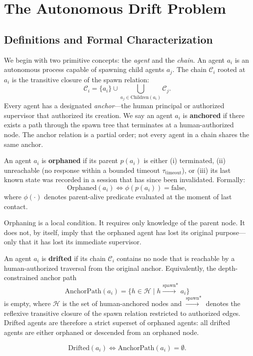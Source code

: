 \section{The Autonomous Drift Problem}

\subsection{Definitions and Formal Characterization}

We begin with two primitive concepts: the \textit{agent} and the \textit{chain}. An agent $a_i$ is an autonomous process capable of spawning child agents $a_j$. The chain $\mathcal{C}_i$ rooted at $a_i$ is the transitive closure of the spawn relation:
\[
\mathcal{C}_i = \{a_i\} \cup \bigcup_{a_j \in \text{Children}(a_i)} \mathcal{C}_j.
\]
Every agent has a designated \textit{anchor}—the human principal or authorized supervisor that authorized its creation. We say an agent $a_i$ is \textbf{anchored} if there exists a path through the spawn tree that terminates at a human-authorized node. The anchor relation is a partial order; not every agent in a chain shares the same anchor.

\begin{definition}
An agent $a_i$ is \textbf{orphaned} if its parent $p(a_i)$ is either (i) terminated, (ii) unreachable (no response within a bounded timeout $\tau_{\text{timeout}}$), or (iii) its last known state was recorded in a session that has since been invalidated. Formally:
\[
\text{Orphaned}(a_i) \iff \phi(p(a_i)) = \text{false},
\]
where $\phi(\cdot)$ denotes parent-alive predicate evaluated at the moment of last contact.
\end{definition}

Orphaning is a local condition. It requires only knowledge of the parent node. It does not, by itself, imply that the orphaned agent has lost its original purpose—only that it has lost its immediate supervisor.

\begin{definition}
An agent $a_i$ is \textbf{drifted} if its chain $\mathcal{C}_i$ contains no node that is reachable by a human-authorized traversal from the original anchor. Equivalently, the depth-constrained anchor path
\[
\text{AnchorPath}(a_i) = \{h \in \mathcal{H} \mid h \xrightarrow{\text{spawn}}^* a_i\}
\]
is empty, where $\mathcal{H}$ is the set of human-anchored nodes and $\xrightarrow{\text{spawn}}^*$ denotes the reflexive transitive closure of the spawn relation restricted to authorized edges. Drifted agents are therefore a strict superset of orphaned agents: all drifted agents are either orphaned or descended from an orphaned node.

\[
\text{Drifted}(a_i) \iff \text{AnchorPath}(a_i) = \emptyset.
\]
\end{definition}

